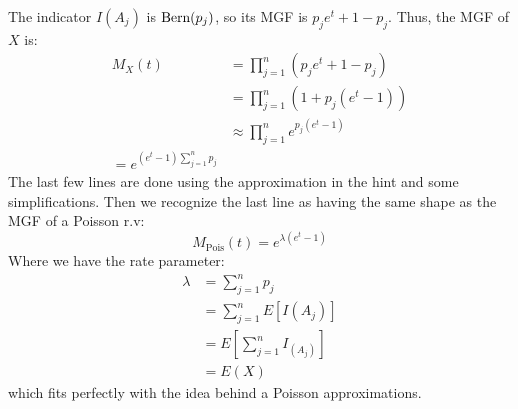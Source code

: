 \documentclass[11pt]{article}
\begin{document}
\begin{solution}
The indicator $I(A_j)$ is $\textrm{Bern}(p_j)$, so its MGF is $p_je^t + 1-p_j$. Thus, the MGF of $X$ is:
\begin{align*}
M_X(t) &= \prod_{j=1}^n (p_je^t + 1 - p_j)\\
&= \prod_{j=1}^n (1 + p_j(e^t - 1)) \\
&\approx \prod_{j=1}^n e^{p_j(e^t - 1)} \\
= e^{(e^t - 1)\sum_{j=1}^n p_j}
\end{align*}
The last few lines are done using the approximation in the hint and some simplifications. Then we recognize the last line as having the same shape as the MGF of a Poisson r.v:
$$
M_{\text{Pois}}(t) = e^{\lambda(e^t - 1)}
$$
Where we have the rate parameter:
\begin{align*}
\lambda &= \sum_{j=1}^n p_j \\
&= \sum_{j=1}^n E[I(A_j)] \\
&= E[\sum_{j=1}^{n} I_(A_j)] \\
&= E(X)
\end{align*}
which fits perfectly with the idea behind a Poisson approximations.
\end{solution}
\end{document}
